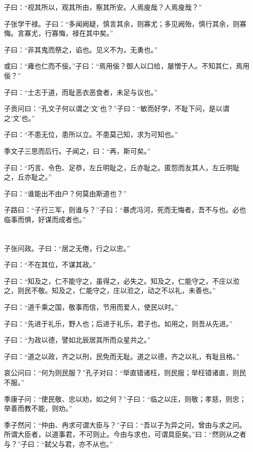 \documentclass[a5paper]{ctexbook}
\begin{document}
    子曰：“视其所以，观其所由，察其所安。人焉廋哉？人焉廋哉？”

    子张学干禄。子曰：“多闻阙疑，慎言其余，则寡尤；多见阙殆，慎行其余，则寡悔。言寡尤，行寡悔，禄在其中矣。”

    子曰：“非其鬼而祭之，谄也。见义不为，无勇也。”

    或曰：“雍也仁而不佞。”子曰：“焉用佞？御人以口给，屡憎于人。不知其仁，焉用佞？”

    子曰：“士志于道，而耻恶衣恶食者，未足与议也。”

    子贡问曰：“孔文子何以谓之‘文’也？”子曰：“敏而好学，不耻下问，是以谓之‘文’也。”

    子曰：“不患无位，患所以立。不患莫己知，求为可知也。”

    季文子三思而后行。子闻之，曰：“再，斯可矣。” 

    子曰：“巧言、令色、足恭，左丘明耻之，丘亦耻之。匿怨而友其人，左丘明耻之，丘亦耻之。”
    
    子曰：“谁能出不由户？何莫由斯道也？”
    
    子路曰：“子行三军，则谁与？”子曰：“暴虎冯河，死而无悔者，吾不与也。必也临事而惧，好谋而成者也。”

    \chapter{}

    子张问政。子曰：“居之无倦，行之以忠。”

    子曰：“不在其位，不谋其政。”

    子曰：“知及之，仁不能守之，虽得之，必失之。知及之，仁能守之，不庄以涖之，则民不敬。知及之，仁能守之，庄以涖之，动之不以礼，未善也。”

    子曰：“道千乘之国，敬事而信，节用而爱人，使民以时。”

    子曰：“先进于礼乐，野人也；后进于礼乐，君子也。如用之，则吾从先进。”

    子曰：“为政以德，譬如北辰居其所而众星共之。”

    子曰：“道之以政，齐之以刑，民免而无耻。道之以德，齐之以礼，有耻且格。”

    哀公问曰：“何为则民服？”孔子对曰：“举直错诸枉，则民服；举枉错诸直，则民不服。”

    季康子问：“使民敬、忠以劝，如之何？”子曰：“临之以庄，则敬；孝慈，则忠；举善而教不能，则劝。”

    季子然问：“仲由、冉求可谓大臣与？”子曰：“吾以子为异之问，曾由与求之问。所谓大臣者，以道事君，不可则止。今由与求也，可谓具臣矣。”曰：“然则从之者与？”子曰：“弑父与君，亦不从也。”
\end{document}
